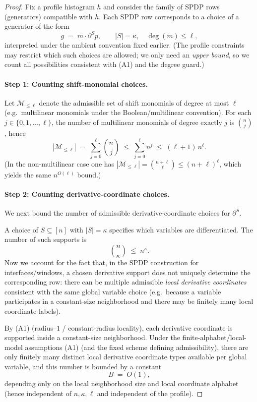 \documentclass[12pt]{article}
\theoremstyle{definition}
\theoremstyle{remark}
\begin{document}
\begin{proof}
Fix a profile histogram $h$ and consider the family of SPDP rows (generators)
compatible with $h$. Each SPDP row corresponds to a choice of a generator of the
form
\[
g \;=\; m \cdot \partial^{S}p,
\qquad |S|=\kappa,\quad \deg(m)\le \ell,
\]
interpreted under the ambient convention fixed earlier. (The profile constraints
may restrict which such choices are allowed; we only need an \emph{upper bound}, so
we count all possibilities consistent with (A1) and the degree guard.)

\paragraph{Step 1: Counting shift-monomial choices.}
Let $\mathcal{M}_{\le \ell}$ denote the admissible set of shift monomials of degree
at most $\ell$ (e.g.\ multilinear monomials under the Boolean/multilinear
convention). For each $j\in\{0,1,\dots,\ell\}$, the number of multilinear monomials
of degree exactly $j$ is $\binom{n}{j}$, hence
\[
|\mathcal{M}_{\le \ell}|
\;=\;
\sum_{j=0}^{\ell} \binom{n}{j}
\;\le\;
\sum_{j=0}^{\ell} n^{j}
\;\le\;
(\ell+1)\,n^{\ell}.
\]
(In the non-multilinear case one has $|\mathcal{M}_{\le \ell}|=\binom{n+\ell}{\ell}
\le (n+\ell)^\ell$, which yields the same $n^{O(\ell)}$ bound.)

\paragraph{Step 2: Counting derivative-coordinate choices.}
We next bound the number of admissible derivative-coordinate choices for
$\partial^{S}$.

A choice of $S\subseteq[n]$ with $|S|=\kappa$ specifies which variables are
differentiated. The number of such supports is
\[
\binom{n}{\kappa} \;\le\; n^{\kappa}.
\]
Now we account for the fact that, in the SPDP construction for interfaces/windows,
a chosen derivative support does not uniquely determine the corresponding row:
there can be multiple admissible \emph{local derivative coordinates} consistent
with the same global variable choice (e.g.\ because a variable participates in a
constant-size neighborhood and there may be finitely many local coordinate labels).

By (A1) (radius--$1$ / constant-radius locality), each derivative coordinate is
supported inside a constant-size neighborhood. Under the finite-alphabet/local-model
assumptions (A1) (and the fixed scheme defining admissibility), there are only
finitely many distinct local derivative coordinate types available per global
variable, and this number is bounded by a constant
\[
B \;=\; O(1),
\]
depending only on the local neighborhood size and local coordinate alphabet (hence
independent of $n,\kappa,\ell$ and independent of the profile).


\end{proof}
\end{document}
